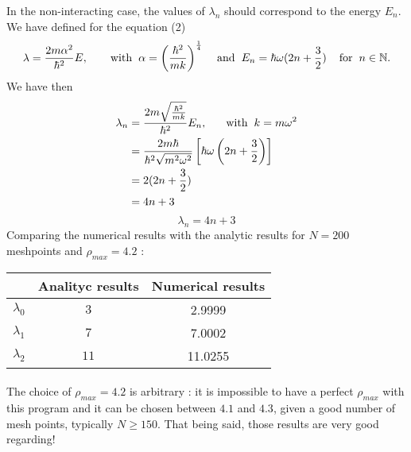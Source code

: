 \documentclass[a4paper, twoside, 11pt]{report}
\theoremstyle{theorem}
\theoremstyle{remark}
\theoremstyle{exemple}
\newcommand{\N}{\mathbb{N}}
\begin{document}
         In the non-interacting case, the values of $\lambda_n$ should correspond to the energy $E_n$. We have defined for the equation (2)  
         \begin{equation*}
            \lambda = \frac{2m\alpha^2}{\hbar^2}E, \hspace{0.7cm} \text{with} \hspace{0.2cm} \alpha = \left(\frac{\hbar^2}{mk}\right)^\frac{1}{4} \hspace{0.4cm} \text{and} \hspace{0.2cm} E_n = \hbar \omega (2n+\frac{3}{2}) \hspace{0.4cm} \text{for} \hspace{0.2cm} n \in \N. 
         \end{equation*}
         We have then
         \begin{align*}
            \lambda_n &= \frac{2m\sqrt{\frac{\hbar^2}{mk}}}{\hbar^2}E_n, \hspace{0.6cm}\text{with} \hspace{0.2cm} k = m\omega^2 \\
             &= \frac{2m\hbar}{\hbar^2\sqrt{m^2\omega^2}}\left[\hbar\omega\left(2n+\frac{3}{2}\right)\right]\\
             &= 2(2n+\frac{3}{2})\\
             &= 4n + 3
        \end{align*}
        \begin{equation}
            \lambda_n = 4n +3
        \tag{9}
        \end{equation}
        Comparing the numerical results with the analytic results for $N=200$ meshpoints and $\rho_{max} = 4.2$ : 
        \begin{center}
            \begin{tabular}{|*{3}{c|}}
                \hline
                & Analityc results & Numerical results \\
                \hline
                $\lambda_0$ & $3$ & 2.9999\\
                \hline
                $\lambda_1$ & $7$ & 7.0002\\
                \hline
                $\lambda_2$ & $11$ & 11.0255\\
                \hline
            \end{tabular}
        \end{center}     
        
        \paragraph{}The choice of $\rho_{max} = 4.2$ is arbitrary : it is impossible to have a perfect $\rho_{max}$ with this program and it can be chosen between $4.1$ and $4.3$, given a good number of mesh points, typically $N\geq 150$. That being said, those results are very good regarding!  
        
\end{document}
